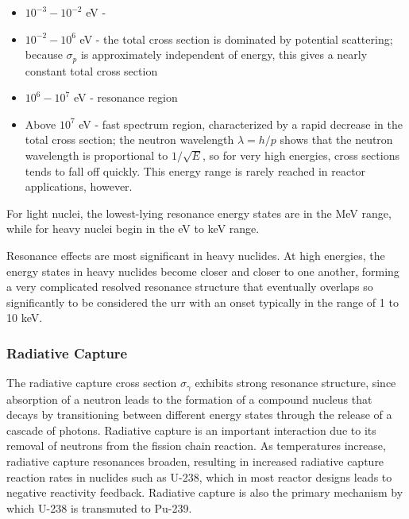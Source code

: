 \begin{itemize}
\item \(10^{-3}-10^{-2}\) eV - 
\item \(10^{-2}-10^6\) eV - the total cross section is dominated by potential scattering; because \(\sigma_p\) is approximately independent of energy, this gives a nearly constant total cross section 
\item \(10^6-10^7\) eV - resonance region
\item Above \(10^7\) eV - fast spectrum region, characterized by a rapid decrease in the total cross section; the neutron wavelength \(\lambda=h/p\) shows that the neutron wavelength is proportional to \(1/\sqrt{E}\), so for very high energies, cross sections tends to fall off quickly. This energy range is rarely reached in reactor applications, however.
\end{itemize}

For light nuclei, the lowest-lying resonance energy states are in the MeV range, while for heavy nuclei begin in the eV to keV range. 

Resonance effects are most significant in heavy nuclides. At high energies, the energy states in heavy nuclides become closer and closer to one another, forming a very complicated resolved resonance structure that eventually overlaps so significantly to be considered the \gls{urr} with an onset typically in the range of 1 to 10 keV.


\subsubsection{Radiative Capture}

The radiative capture cross section \(\sigma_\gamma\) exhibits strong resonance structure, since absorption of a neutron leads to the formation of a compound nucleus that decays by transitioning between different energy states through the release of a cascade of photons. Radiative capture is an important interaction due to its removal of neutrons from the fission chain reaction. As temperatures increase, radiative capture resonances broaden, resulting in increased radiative capture reaction rates in nuclides such as U-238, which in most reactor designs leads to negative reactivity feedback. Radiative capture is also the primary mechanism by which U-238 is transmuted to Pu-239.

